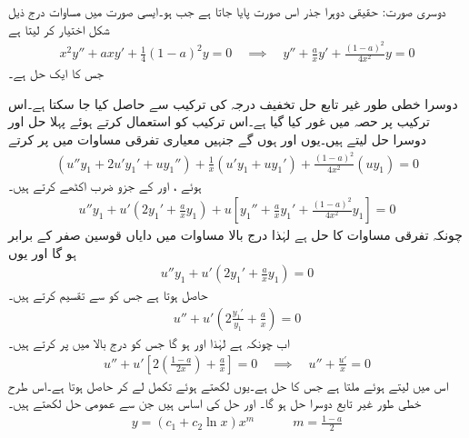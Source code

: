 دوسری صورت: حقیقی دوہرا جذر  اس صورت پایا جاتا ہے جب  ہو۔ایسی صورت میں مساوات  درج ذیل شکل اختیار کر لیتا ہے
\begin{align}\label{مساوات_سادہ_دو_یولر_کوشی_دوہرا_الف}
x^2y''+axy'+\frac{1}{4}(1-a)^2y=0 \quad \implies \quad y''+\frac{a}{x}y'+\frac{(1-a)^2}{4x^2}y=0
\end{align}
جس کا ایک حل  ہے۔

دوسرا خطی طور غیر تابع حل  تخفیف درجہ کی ترکیب سے حاصل کیا جا سکتا ہے۔اس ترکیب پر حصہ  میں غور کیا گیا ہے۔اس ترکیب کو استعمال کرتے ہوئے پہلا حل  اور دوسرا حل  لیتے ہیں۔یوں  اور  ہوں گے جنہیں معیاری تفرقی مساوات  میں پر کرتے 
\begin{align*}
(u''y_1+2u'y_1'+uy_1'')+\frac{1}{x} (u'y_1+uy_1')+\frac{(1-a)^2}{4x^2}(uy_1)=0
\end{align*} 
ہوئے ،  اور  کے جزو ضرب اکٹھے کرتے ہیں۔
\begin{align*}
u''y_1+u'(2y_1'+\frac{a}{x}y_1)+u[y_1''+\frac{a}{x}y_1'+\frac{(1-a)^2}{4x^2}y_1]=0
\end{align*}
چونکہ  تفرقی مساوات کا حل ہے لہٰذا درج بالا مساوات میں دایاں قوسین صفر کے برابر ہو گا اور یوں 
\begin{align*}
u''y_1+u'(2y_1'+\frac{a}{x}y_1)=0
\end{align*}
حاصل ہوتا ہے جس کو  سے تقسیم کرتے ہیں۔
\begin{align*}
u''+u'\left(2\frac{y_1'}{y_1}+\frac{a}{x}\right)=0
\end{align*}
اب چونکہ  ہے لہٰذا  اور  ہو گا جس کو درج بالا میں پر کرتے  ہیں۔
\begin{align*}
u''+u'\left[2 \left(\frac{1-a}{2x}\right)+\frac{a}{x}\right]=0 \quad \implies \quad u''+\frac{u'}{x}=0
\end{align*}
اس میں  لیتے ہوئے  ملتا ہے جس کا حل  ہے۔یوں  لکھتے ہوئے تکمل لے کر  حاصل ہوتا ہے۔اس طرح خطی طور غیر تابع دوسرا حل  ہو گا۔ اور  حل کی اساس ہیں جن سے عمومی حل لکھتے ہیں۔
\begin{align}
y=(c_1+c_2\ln x)x^m \quad \quad \quad m=\frac{1-a}{2}
\end{align}


